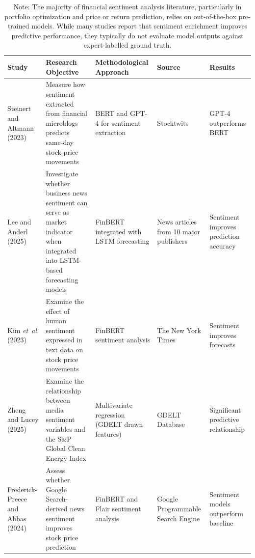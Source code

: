 \begin{table}[ht]
\centering
\caption{Overview of selected prior studies on narrative analysis, summarizing research objectives, methodological approaches, sources of textual data, and reported results regarding the contribution of sentiment features to financial prediction tasks.}
\label{tab:literature_review_sentiment}
\begin{tabular}{|>{\centering\arraybackslash}m{1.6cm}|
                >{\centering\arraybackslash}m{4.5cm}|
                >{\centering\arraybackslash}m{3cm}|
                >{\centering\arraybackslash}m{1.7cm}|
                >{\centering\arraybackslash}m{2.4cm}|}
\hline
\textbf{Study} & \textbf{Research Objective} & \textbf{Methodological Approach} & \textbf{Source} & \textbf{Results} \\
\hline

Steinert and Altmann (2023)~\cite{a12be}
  & Measure how sentiment extracted from financial microblogs predicts same-day stock price movements
  & BERT and GPT-4 for sentiment extraction
  & Stocktwits
  & GPT-4 outperforms BERT \\
\hline
Lee and Anderl (2025)~\cite{93d76}
  & Investigate whether business news sentiment can serve as market indicator when integrated into LSTM-based forecasting models
  & FinBERT integrated with LSTM forecasting
  & News articles from 10 major publishers
  & Sentiment improves prediction accuracy \\
\hline
Kim \emph{et~al.} (2023)~\cite{339f6}
  & Examine the effect of human sentiment expressed in text data on stock price movements
  & FinBERT sentiment analysis
  & The New York Times
  & Sentiment improves forecasts \\
\hline
Zheng and Lucey (2025)~\cite{4e6ff}
  & Examine the relationship between media sentiment variables and the S\&P Global Clean Energy Index
  & Multivariate regression (GDELT drawn features)
  & GDELT Database
  & Significant predictive relationship \\
\hline
Frederick-Preece and Abbas (2024)~\cite{2b4c0}
  & Assess whether Google Search-derived news sentiment improves stock price prediction
  & FinBERT and Flair sentiment analysis
  & Google Programmable Search Engine
  & Sentiment models outperform baseline \\

\hline
\end{tabular}
\caption*{\footnotesize
Note: The majority of financial sentiment analysis literature, particularly in portfolio optimization and price or return prediction, relies on out-of-the-box pre-trained models. While many studies report that sentiment enrichment improves predictive performance, they typically do not evaluate model outputs against expert-labelled ground truth.
}
\end{table}

